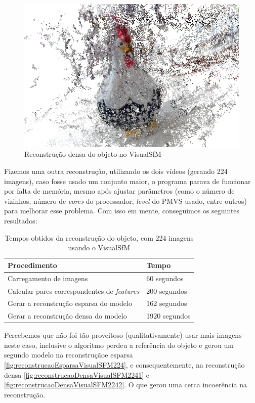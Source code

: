 \begin{figure}[!h]
	\centering
	\includegraphics[width=0.5\linewidth]{figs/galinhadense.jpg}
	\caption{%
	Reconstrução densa do objeto no VisualSfM
	}\label{fig:reconstrucaoDensaVisualSFM}
\end{figure}

Fizemos uma outra reconstrução, utilizando os dois vídeos (gerando 224 imagens), caso fosse usado um conjunto maior, o programa parava de funcionar por falta de memória, mesmo após ajustar parâmetros (como o número de vizinhos, número de {\it cores} do processador, {\it level} do PMVS usado, entre outros) para melhorar esse problema. Com isso em mente, conseguimos os seguintes resultados:

\begin{table}
\caption{Tempos obtidos da reconstrução do objeto, com 224 imagens usando o VisualSfM}
\label{tab:temposSfM224}
\begin{tabular}{|l|p{4.7cm}|}
\hline
Procedimento & Tempo \\ \hline
Carregamento de imagens & 60 segundos \\ \hline
Calcular pares correspondentes de {\it features} & 200 segundos \\ \hline
Gerar a reconstrução esparsa do modelo & 162 segundos \\ \hline
Gerar a reconstrução densa do modelo & 1920 segundos \\ \hline
\end{tabular}
\end{table}

Percebemos que não foi tão proveitoso (qualitativamente) usar mais imagens neste caso, inclusive o algoritmo perdeu a referência do objeto e gerou um segundo modelo na reconstruçãoe esparsa \ref{fig:reconstrucaoEsparsaVisualSFM224}, e consequentemente, na reconstrução densa \ref{fig:reconstrucaoDensaVisualSFM2241} e \ref{fig:reconstrucaoDensaVisualSFM2242}. O que gerou uma cerca incoerência na reconstrução.

